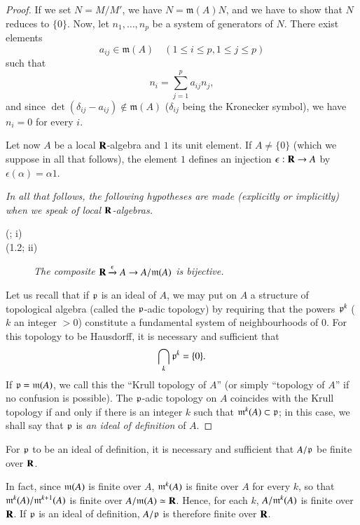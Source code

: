 \begin{proof}
If we set $N=M/M'$, we have $N=\mathfrak{m}(A)N$, and we have to show that $N$ reduces to $\{0\}$. Now, let $n_{1},\ldots,n_{p}$ be a system of generators of $N$. There exist elements
$$
a_{ij}\in \mathfrak{m}(A)\quad (1\leq i\leq p, 1\leq j\leq p)
$$
such that
$$
n_{i}=\sum\limits^{p}_{j=1}a_{ij}n_{j},
$$
and since $\det (\delta_{ij}-a_{ij})\not\in \mathfrak{m}(A)$ ($\delta_{ij}$ being the Kronecker symbol), we have $n_{i}=0$ for every $i$.

Let now $A$ be a local $\mathbf{R}$-algebra and $1$ its unit element. If $A\neq \{0\}$ (which we suppose in all that follows), the element $1$ defines an injection $\epsilon:\mathbf{R}\to A$ by $\epsilon(\alpha)=\alpha 1$.

{\em In all that follows, the following hypotheses are made (explicitly or implicitly) when we speak of local $\mathbf{R}$-algebras.}
\begin{description}
\item[(;\label{chap3-id1.2} i)]

\item[(1.2; ii)] {\em The composite $\mathbf{R}\xrightarrow{\epsilon}A\to A/\mathfrak{m}(A)$ is bijective.}
\end{description}

Let us recall that if $\mathfrak{p}$ is an ideal of $A$, we may put on $A$ a structure of topological algebra (called the $\mathfrak{p}$-adic topology) by requiring that the powers $\mathfrak{p}^{k}$ ($k$ an integer $>0$) constitute a fundamental system of neighbourhoods of $0$. For this topology to be Hausdorff, it is necessary and sufficient that
$$
\bigcap\limits_{k}\mathfrak{p}^{k}=\{0\}.
$$
If $\mathfrak{p}=\mathfrak{m}(A)$, we call this the ``Krull topology of $A$'' (or simply ``topology of $A$'' if no confusion is possible). The $\mathfrak{p}$-adic topology on $A$ coincides with the Krull topology if and only if there is an integer $k$ such that $\mathfrak{m}^{k}(A)\subset \mathfrak{p}$; in this case, we shall say that $\mathfrak{p}$ is {\em an ideal of definition} of $A$.
\end{proof}

\setcounter{theorem}{2}
\begin{proposition}\label{chap2-prop1.3}
For $\mathfrak{p}$ to be an ideal of definition, it is necessary and sufficient that $A/\mathfrak{p}$ be finite over $\mathbf{R}$.
\end{proposition}

In fact, since $\mathfrak{m}(A)$ is finite over $A$, $\mathfrak{m}^{k}(A)$ is finite over $A$ for every $k$, so that $\mathfrak{m}^{k}(A)/\mathfrak{m}^{k+1}(A)$ is finite over $A/\mathfrak{m}(A)\simeq \mathbf{R}$. Hence, for each $k$, $A/\mathfrak{m}^{k}(A)$ is finite over $\mathbf{R}$. If $\mathfrak{p}$ is an ideal of definition, $A/\mathfrak{p}$ is therefore finite over $\mathbf{R}$.

